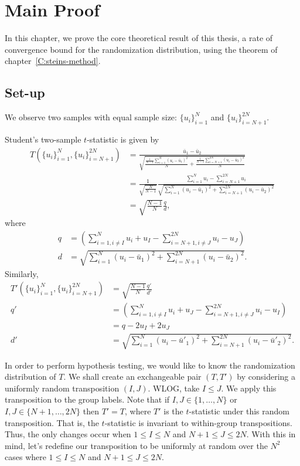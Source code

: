 \chapter{Main Proof}
\label{C:stein-proof}
In this chapter, we prove the core theoretical result of this thesis, a rate of convergence bound for
the randomization distribution, using the theorem of chapter~\ref{C:steins-method}.

\section{Set-up}
We observe two samples with equal sample size: $\{u_i\}_{i=1}^N$ and $\{u_i\}_{i=N+1}^{2N}$.  

Student's two-sample $t$-statistic is given by
\begin{align*}
T(\{u_i\}_{i=1}^N, \{u_i\}_{i=N+1}^{2N}) 
&= \frac{\bar{u}_1 - \bar{u}_2}{\sqrt{\frac{\frac{1}{N-1}
      \sum_{i=1}^N(u_i - \bar{u}_1)^2}{N} + \frac{\frac{1}{N-1}
      \sum_{i=N+1}^{2N}(u_i - \bar{u}_2)^2}{N}}} \\
&= \frac{1}{\sqrt{\frac{N}{N-1}}} \frac{\sum_{i=1}^N u_i -
  \sum_{i=N+1}^{2N}u_i}{\sqrt{\sum_{i=1}^N(u_i - 
    \bar{u}_1)^2 + \sum_{i=N+1}^{2N}(u_i - \bar{u}_2)^2}} \\
&= \sqrt{\frac{N-1}{N}}\frac{q}{d},
\end{align*}
where
\begin{align*}
  q &= \left (\sum_{i=1, i\neq I}^N u_i + u_I -
    \sum_{i=N+1, i\neq J}^{2N}u_i - u_J\right ) \\
  d &= \sqrt{\sum_{i=1}^N(u_i - \bar{u}_1)^2 +
    \sum_{i=N+1}^{2N}(u_i - \bar{u}_2)^2}.
\end{align*}
Similarly, 
\begin{align*}
  T'(\{u_i\}_{i=1}^N, \{u_i\}_{i=N+1}^{2N}) 
  &= \sqrt{\frac{N-1}{N}}\frac{q'}{d'} \\
  q' &= \left (\sum_{i=1, i\neq I}^N u_i + u_J -
    \sum_{i=N+1, i\neq J}^{2N}u_i - u_I \right ) \\
  &= q - 2u_I + 2u_J \\
  d' &= \sqrt{\sum_{i=1}^N(u_i - \bar{u}'_1)^{2} +
    \sum_{i=N+1}^{2N}(u_i - \bar{u}'_2)^{2}}.  
\end{align*}

In order to perform hypothesis testing, we would like to know the randomization distribution of $T$.
We shall create an exchangeable pair $(T, T')$ by considering a uniformly random transposition $(I,
J)$.  WLOG, take $I \leq J$.  We apply this transposition to the group labels.  Note that if $I, J
\in \{1,\ldots,N\}$ or $I, J \in \{N+1,\ldots,2N\}$ then $T' = T$, where $T'$ is the $t$-statistic
under this random transposition.  That is, the $t$-statistic is invariant to within-group
transpositions.  Thus, the only changes occur when $1 \leq I \leq N$ and $N + 1 \leq J \leq 2N$.
With this in mind, let's redefine our transposition to be uniformly at random over the $N^2$ cases
where $1 \leq I \leq N$ and $N + 1 \leq J \leq 2N$.

